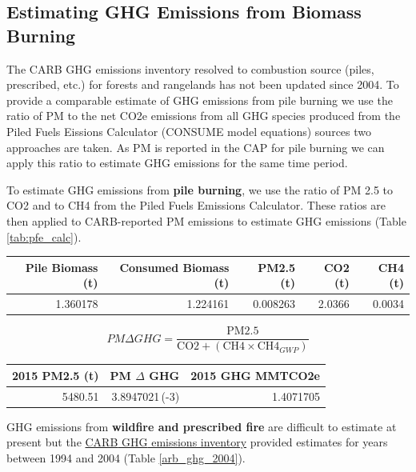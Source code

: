 \documentclass[a4paper]{article}
\begin{document}
\subsection{Estimating \ac{GHG} Emissions from Biomass Burning}
\label{sec:orgheadline5}
The \ac{CARB} GHG emissions inventory resolved to combustion source (piles, prescribed, etc.) for forests and rangelands has not been updated since 2004. To provide a comparable estimate of GHG emissions from pile burning we use the ratio of \ac{PM} to the net \ac{CO2e} emissions from all \ac{GHG} species produced from the Piled Fuels Eissions Calculator (CONSUME model equations) sources two approaches are taken. As \ac{PM} is reported in the \ac{CAP} for pile burning we can apply this ratio to estimate \ac{GHG} emissions for the same time period.


To estimate \ac{GHG} emissions from \textbf{pile burning}, we use the ratio of
PM 2.5 to CO2 and to CH4 from the Piled Fuels Emissions Calculator. These ratios are then applied to CARB-reported PM emissions to estimate \ac{GHG} emissions (Table \ref{tab:pfe_calc}).

\begin{center}
\begin{tabular}{rrrrr}
Pile Biomass (t) & Consumed Biomass (t) & PM2.5 (t) & CO2 (t) & CH4 (t)\\
\hline
1.360178 & 1.224161 & 0.008263 & 2.0366 & 0.0034\\
\end{tabular}
\label{tab:orgtable2}


\end{center}
\begin{equation}
     PM \Delta GHG= \frac{\mathrm{PM2.5}}{\mathrm{CO2} + \left(\mathrm{CH4} \times \mathrm{CH4}_{GWP}\right)}
\end{equation}

\begin{center}
\begin{tabular}{rrr}
2015 PM2.5 (t) & PM \(\Delta\) GHG & 2015 \ac{GHG} MMTCO2e\\
\hline
5480.51 & 3.8947021\,(-3) & 1.4071705\\
\end{tabular}
\label{tab:orgtable3}


\end{center}
\ac{GHG} emissions from \textbf{wildfire and prescribed fire} are difficult to estimate at present but the
\href{http://www.arb.ca.gov/cc/inventory/archive/tables/net_co2_flux_2007-11-19.pdf}{\ac{CARB} \ac{GHG} emissions inventory} provided estimates for years between 1994 and 2004 (Table \ref{arb_ghg_2004}).
\end{document}
